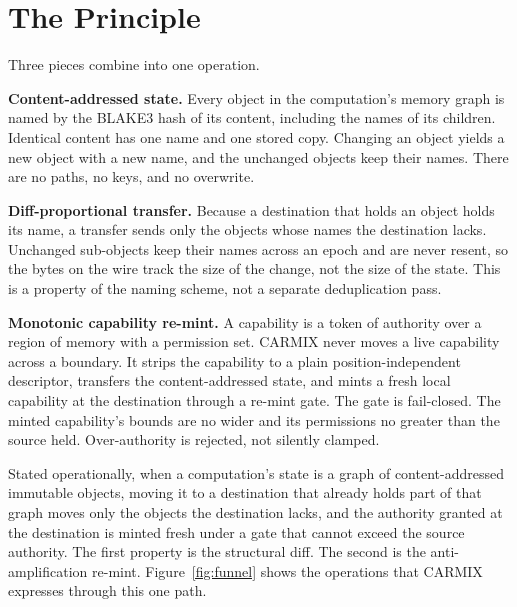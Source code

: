 \documentclass[10pt,twocolumn]{article}
\newcommand{\carmix}{CARMIX}
\begin{document}
\section{The Principle}

Three pieces combine into one operation.

\textbf{Content-addressed state.} Every object in the computation's memory graph
is named by the BLAKE3 hash of its content, including the names of its children.
Identical content has one name and one stored copy. Changing an object yields a
new object with a new name, and the unchanged objects keep their names. There are
no paths, no keys, and no overwrite.

\textbf{Diff-proportional transfer.} Because a destination that holds an object
holds its name, a transfer sends only the objects whose names the destination
lacks. Unchanged sub-objects keep their names across an epoch and are never
resent, so the bytes on the wire track the size of the change, not the size of
the state. This is a property of the naming scheme, not a separate deduplication
pass.

\textbf{Monotonic capability re-mint.} A capability is a token of authority over
a region of memory with a permission set. \carmix{} never moves a live capability
across a boundary. It strips the capability to a plain position-independent
descriptor, transfers the content-addressed state, and mints a fresh local
capability at the destination through a re-mint gate. The gate is fail-closed.
The minted capability's bounds are no wider and its permissions no greater than
the source held. Over-authority is rejected, not silently clamped.

Stated operationally, when a computation's state is a graph of content-addressed
immutable objects, moving it to a destination that already holds part of that
graph moves only the objects the destination lacks, and the authority granted at
the destination is minted fresh under a gate that cannot exceed the source
authority. The first property is the structural diff. The second is the
anti-amplification re-mint. Figure~\ref{fig:funnel} shows the operations that
\carmix{} expresses through this one path.
\end{document}
